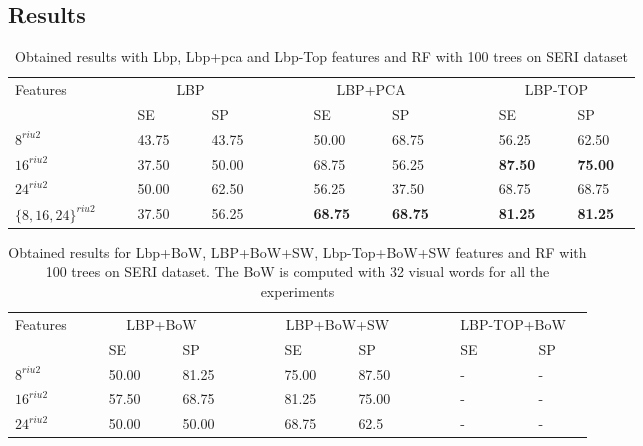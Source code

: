 
\subsection{Results}


\begin{table}
\caption{Obtained results with Lbp, Lbp+pca and Lbp-Top features and RF with 100 trees on SERI dataset}
\centering
\begin{tabular}{lcclcclcccclcclcccclcclc}
\toprule
Features 	& & &\multicolumn{4}{c}{LBP}&	 & & & &\multicolumn{4}{c}{LBP+PCA}& & & & &\multicolumn{4}{c}{LBP-TOP} &\\
  \cmidrule(l){2-8}  \cmidrule(l){10-16}  \cmidrule(l){18-24}
	       & & & SE & & & SP & & & & & SE & & & SP & & & & & SE & & & SP & \\
\midrule
 $8^{riu2}$ 						& & & 43.75 & & & 43.75 & & & & & 50.00 & & & 68.75 & & & & & 56.25 & & & 62.50 & \\	
 $16^{riu2}$						& & & 37.50 & & & 50.00 & & & & & 68.75 & & & 56.25 & & & & & \textbf{87.50} & & & \textbf{75.00} & \\	
 $24^{riu2}$						& & & 50.00 & & & 62.50 & & & & & 56.25 & & & 37.50 & & & & & 68.75 & & & 68.75 & \\
 $\lbrace 8,16,24\rbrace^{riu2}$	& & & 37.50 & & & 56.25 & & & & & \textbf{68.75} & & & \textbf{68.75} & & & & & \textbf{81.25} & & & \textbf{81.25} & \\
\bottomrule
\end{tabular}
\label{tab:LbPTopVolumeResult}
\end{table}



\begin{table}
\caption{Obtained results for Lbp+BoW, LBP+BoW+SW, Lbp-Top+BoW+SW features and RF with 100 trees on SERI dataset. The BoW is computed with 32 visual words for all the experiments}
\centering
\begin{tabular}{lcclcclcccclcclcccclcclc}
\toprule
Features 	& & &\multicolumn{4}{c}{LBP+BoW}&	 & & & &\multicolumn{4}{c}{LBP+BoW+SW}& & & & &\multicolumn{4}{c}{LBP-TOP+BoW} &\\
  \cmidrule(l){2-8}  \cmidrule(l){10-16}  \cmidrule(l){18-24}
	       & & & SE & & & SP & & & & & SE & & & SP & & & & & SE & & & SP & \\
\midrule
 $8^{riu2}$ 						& & & 50.00 & & & 81.25 & & & & & 75.00 & & & 87.50 & & & & & - & & & - & \\	
 $16^{riu2}$						& & & 57.50 & & & 68.75 & & & & & 81.25 & & & 75.00 & & & & & - & & & - & \\	
 $24^{riu2}$						& & & 50.00 & & & 50.00 & & & & & 68.75 & & & 62.5 & & & & & - & & & - & \\
\bottomrule
\end{tabular}
\label{tab:SERIBoWResult}
\end{table}



